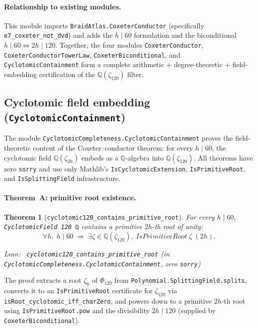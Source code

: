 \documentclass[11pt,a4paper]{article}
\newenvironment{leanref}%
  {\par\smallskip\noindent\begingroup\raggedright\textup{Lean:}~}%
  {\par\endgroup}
\newtheorem{theorem}{Theorem}[section]
\theoremstyle{definition}
\begin{document}
\paragraph{Relationship to existing modules.}
This module imports \texttt{BraidAtlas.CoxeterConductor} (specifically
\lstinline|e7_coxeter_not_dvd|) and adds the $h \mid 60$ formulation and the
biconditional $h \mid 60 \iff 2h \mid 120$.  Together, the four modules
\texttt{CoxeterConductor}, \texttt{CoxeterConductorTowerLaw},
\texttt{CoxeterBiconditional}, and \texttt{CyclotomicContainment} form a
complete arithmetic + degree-theoretic + field-embedding certification of the
$\mathbb{Q}(\zeta_{120})$ filter.

\subsection{Cyclotomic field embedding (\texttt{CyclotomicContainment})}
\label{sec:cyclotomic_containment}

The module \texttt{CyclotomicCompleteness.CyclotomicContainment} proves the field-theoretic content of the Coxeter--conductor theorem:
for every $h \mid 60$, the cyclotomic field $\mathbb{Q}(\zeta_{2h})$ embeds
as a $\mathbb{Q}$-algebra into $\mathbb{Q}(\zeta_{120})$.  All theorems have
zero \texttt{sorry} and use only Mathlib's \texttt{IsCyclotomicExtension},
\texttt{IsPrimitiveRoot}, and \texttt{IsSplittingField} infrastructure.

\paragraph{Theorem~A: primitive root existence.}
\begin{theorem}[\texttt{cyclotomic120\_contains\_primitive\_root}]
\label{thm:cyclo_prim_root}
For every $h \mid 60$, \lstinline|CyclotomicField 120 ℚ| contains a
primitive $2h$-th root of unity:
\[
  \forall h,\; h \mid 60 \;\Longrightarrow\;
  \exists \zeta \in \mathbb{Q}(\zeta_{120}),\; \mathit{IsPrimitiveRoot}\;\zeta\;(2h).
\]
\begin{leanref}
\lstinline|cyclotomic120_contains_primitive_root|
\textup{(in \texttt{CyclotomicCompleteness.CyclotomicContainment}, zero \texttt{sorry})}
\end{leanref}
\end{theorem}

The proof extracts a root $\zeta_0$ of $\Phi_{120}$ from
\lstinline|Polynomial.SplittingField.splits|, converts it to an
\lstinline|IsPrimitiveRoot| certificate for $\zeta_{120}$ via
\lstinline|isRoot_cyclotomic_iff_charZero|, and powers down to a primitive
$2h$-th root using \lstinline|IsPrimitiveRoot.pow| and the divisibility
$2h \mid 120$ (supplied by \texttt{CoxeterBiconditional}).
\end{document}
